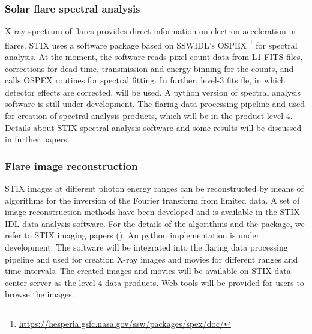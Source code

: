 \documentclass{aa}
\begin{document}
\subsubsection{Solar flare spectral analysis}
X-ray spectrum of  flares provides direct information on electron acceleration in flares. 
STIX uses a software package based on SSWIDL's OSPEX 
\footnote{\url{https://hesperia.gsfc.nasa.gov/ssw/packages/spex/doc/}} for spectral analysis.
At the moment, the software reads pixel count data from L1 FITS files, 
corrections for dead time, transmission and energy binning for the counts,  and calls 
OSPEX routines for spectral fitting.  
In further, level-3 fits fle, in which detector effects are corrected, will be used. 
A python version of spectral analysis 
software is still under development. 
 The flaring data processing pipeline and used for creation of
 spectral analysis products, which will be in the product level-4. 
 Details about STIX spectral analysis software and some 
 results will be discussed in further papers. 
\subsubsection{Flare image reconstruction}
STIX images at different photon energy ranges can
 be reconstructed by means of algorithms  for the inversion of the Fourier transform from limited data.
 A set of image reconstruction methods have been developed  and  is available in the STIX IDL data 
 analysis software. 
 For the details of the algorithms and the package, we refer to 
 STIX imaging papers (\cite{paolo2020}). 
An python implementation is under development. 
The software will be integrated into the flaring data processing pipeline and used for
creation X-ray images and movies for different ranges and time intervals. 
The created images and movies will be available on STIX data center server 
as the level-4 data products.
Web tools will be provided for users to browse the images. 
\end{document}
